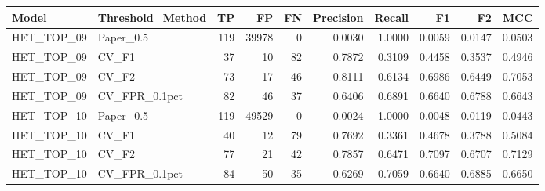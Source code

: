 \begin{tabular}{llrrrrrrrr}
\toprule
Model & Threshold\_Method & TP & FP & FN & Precision & Recall & F1 & F2 & MCC \\
\midrule
HET\_TOP\_09 & Paper\_0.5 & 119 & 39978 & 0 & 0.0030 & 1.0000 & 0.0059 & 0.0147 & 0.0503 \\
HET\_TOP\_09 & CV\_F1 & 37 & 10 & 82 & 0.7872 & 0.3109 & 0.4458 & 0.3537 & 0.4946 \\
HET\_TOP\_09 & CV\_F2 & 73 & 17 & 46 & 0.8111 & 0.6134 & 0.6986 & 0.6449 & 0.7053 \\
HET\_TOP\_09 & CV\_FPR\_0.1pct & 82 & 46 & 37 & 0.6406 & 0.6891 & 0.6640 & 0.6788 & 0.6643 \\
HET\_TOP\_10 & Paper\_0.5 & 119 & 49529 & 0 & 0.0024 & 1.0000 & 0.0048 & 0.0119 & 0.0443 \\
HET\_TOP\_10 & CV\_F1 & 40 & 12 & 79 & 0.7692 & 0.3361 & 0.4678 & 0.3788 & 0.5084 \\
HET\_TOP\_10 & CV\_F2 & 77 & 21 & 42 & 0.7857 & 0.6471 & 0.7097 & 0.6707 & 0.7129 \\
HET\_TOP\_10 & CV\_FPR\_0.1pct & 84 & 50 & 35 & 0.6269 & 0.7059 & 0.6640 & 0.6885 & 0.6650 \\
\bottomrule
\end{tabular}
